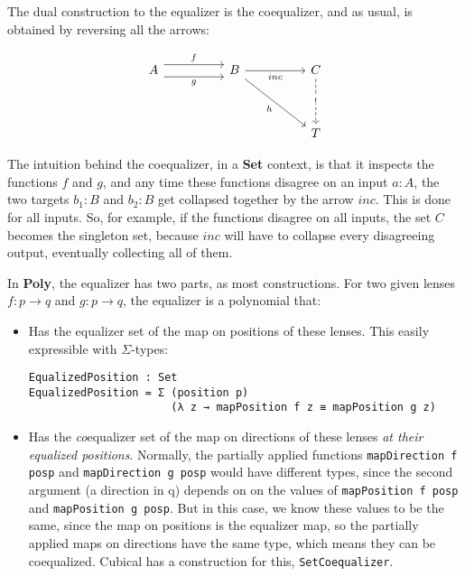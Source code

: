 The dual construction to the equalizer is the coequalizer, and as usual, is obtained by reversing all the arrows:

\[\begin{tikzcd}
	A && B && C \\
	\\
	&&&& T
	\arrow["f", shift left=2, from=1-1, to=1-3]
	\arrow["g"', shift right=2, from=1-1, to=1-3]
	\arrow["inc"', from=1-3, to=1-5]
	\arrow["{!}"{description}, dashed, from=1-5, to=3-5]
	\arrow["h"', from=1-3, to=3-5]
\end{tikzcd}\]

The intuition behind the coequalizer, in a \textbf{Set} context, is that it inspects the functions $f$ and $g$, and any time these functions disagree on an input $a : A$, the two targets $b_1 : B$ and $b_2 : B$ get collapsed together by the arrow $inc$. This is done for all inputs. So, for example, if the functions disagree on all inputs, the set $C$ becomes the singleton set, because $inc$ will have to collapse every disagreeing output, eventually collecting all of them.

In \textbf{Poly}, the equalizer has two parts, as most constructions. For two given lenses $f : p \rightarrow q$ and $g : p \rightarrow q$, the equalizer is a polynomial that:
\begin{itemize}
    \item Has the equalizer set of the map on positions of these lenses. This easily expressible with $\Sigma$-types:
    \begin{verbatim}
EqualizedPosition : Set
EqualizedPosition = Σ (position p)
                      (λ z → mapPosition f z ≡ mapPosition g z)
    \end{verbatim}
    \item Has the \textit{co}equalizer set of the map on directions of these lenses \textit{at their equalized positions}. Normally, the partially applied functions \texttt{mapDirection f posp} and \texttt{mapDirection g posp} would have different types, since the second argument (a direction in q) depends on on the values of \texttt{mapPosition f posp} and \texttt{mapPosition g posp}. But in this case, we know these values to be the same, since the map on positions is the equalizer map, so the partially applied maps on directions have the same type, which means they can be coequalized. Cubical has a construction for this, \texttt{SetCoequalizer}.
\end{itemize}

